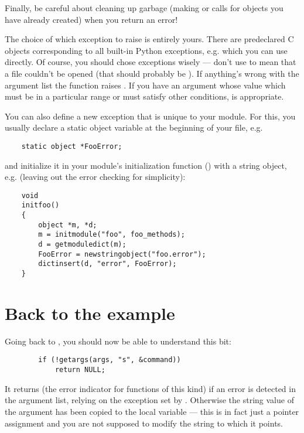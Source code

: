 Finally, be careful about cleaning up garbage (making 
or  calls for objects you have already created) when
you return an error!

The choice of which exception to raise is entirely yours.  There are
predeclared C objects corresponding to all built-in Python exceptions,
e.g.  which you can use directly.  Of course,
you should chose exceptions wisely --- don't use  to
mean that a file couldn't be opened (that should probably be
).  If anything's wrong with the argument list the
 function raises .  If you have an
argument whose value which must be in a particular range or must
satisfy other conditions,  is appropriate.

You can also define a new exception that is unique to your module.
For this, you usually declare a static object variable at the
beginning of your file, e.g.

\begin{verbatim}
    static object *FooError;
\end{verbatim}

and initialize it in your module's initialization function
() with a string object, e.g. (leaving out the error
checking for simplicity):

\begin{verbatim}
    void
    initfoo()
    {
        object *m, *d;
        m = initmodule("foo", foo_methods);
        d = getmoduledict(m);
        FooError = newstringobject("foo.error");
        dictinsert(d, "error", FooError);
    }
\end{verbatim}


\section{Back to the example}

Going back to , you should now be able to
understand this bit:

\begin{verbatim}
        if (!getargs(args, "s", &command))
            return NULL;
\end{verbatim}

It returns  (the error indicator for functions of this
kind) if an error is detected in the argument list, relying on the
exception set by .  Otherwise the string value of the
argument has been copied to the local variable  --- this
is in fact just a pointer assignment and you are not supposed to
modify the string to which it points.

